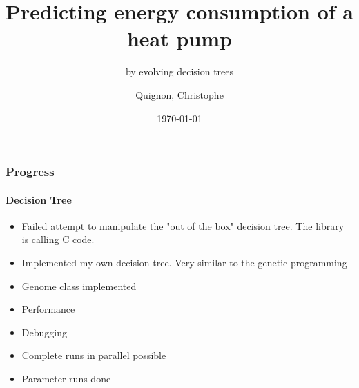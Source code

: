 \documentclass{beamer}
\begin{document}
\title{Predicting energy consumption of a heat pump}
\subtitle{by evolving decision trees}
\author{
  Quignon, Christophe \\
} 
\date{\today}

\begin{frame}
\titlepage{}
\end{frame}


\begin{frame}
\frametitle{Progress}
\framesubtitle{Decision Tree}
\begin{itemize}
\item Failed attempt to manipulate the "out of the box" decision tree.
The library is calling C code.
\item Implemented my own decision tree. Very similar to the genetic programming
\item Genome class implemented
\item Performance
\item Debugging
\item Complete runs in parallel possible
\item Parameter runs done
\end{itemize}
\end{frame}
\end{document}
